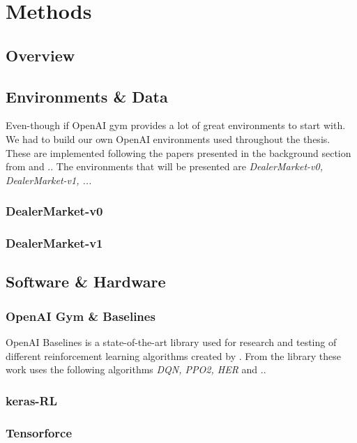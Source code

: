 \documentclass{kththesis}
\theoremstyle{definition}
\begin{document}
\chapter{Methods}

\section{Overview}


\section{Environments \& Data}
Even-though if OpenAI gym provides a lot of great environments to start with. We had to build our own OpenAI environments used throughout the thesis. These are implemented following the papers presented in the background section from \textcite{ho1981optimal} and .. The environments that will be presented are \textit{DealerMarket-v0, DealerMarket-v1, ...}

\subsection{DealerMarket-v0}

\subsection{DealerMarket-v1}


\section{Software \& Hardware}

\subsection{OpenAI Gym \& Baselines}
OpenAI Baselines is a state-of-the-art library used for research and testing of different reinforcement learning algorithms created by \textcite{baselines}. From the library these work uses the following algorithms \textit{DQN, PPO2, HER} and ..

\subsection{keras-RL}

\subsection{Tensorforce}
\end{document}
